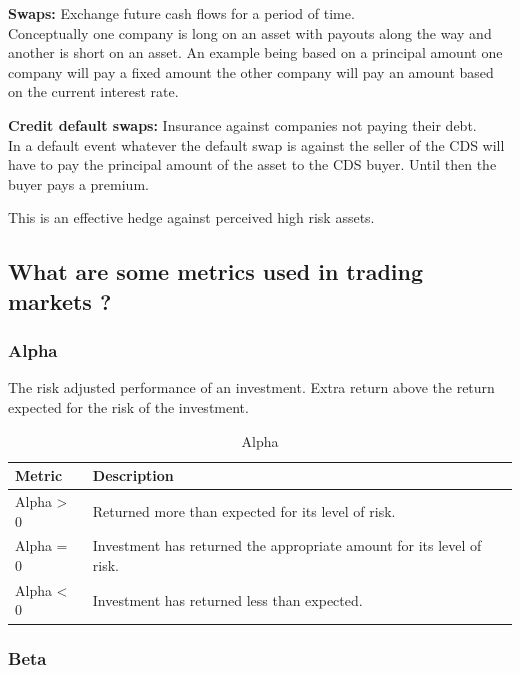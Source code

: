 \documentclass[11pt]{scrartcl} %
\begin{document}
\textbf{Swaps:} Exchange future cash flows for a period of time.\\

Conceptually one company is long on an asset with payouts along the way and another is short on an asset. An example being based on a principal amount one company will pay a fixed amount the other company will pay an amount based on the current interest rate.

\textbf{Credit default swaps:} Insurance against companies not paying their debt.\\

In a default event whatever the default swap is against the seller of the CDS will have to pay the principal amount of the asset to the CDS buyer. Until then the buyer pays a premium.

This is an effective hedge against perceived high risk assets.

\subsection{What are some metrics used in trading markets ?}

\subsubsection{Alpha}

The risk adjusted performance of an investment. Extra return above the return expected for the risk of the investment. 

\begin{table}[h] %
	\centering %
	\begin{tabular}{l l}
		\toprule
		\textbf{Metric} & \textbf{Description} \\
		\midrule
		Alpha > 0 & Returned more than expected for its level of risk.\\
		Alpha = 0 & Investment has returned the appropriate amount for its level of risk.\\
		Alpha < 0 & Investment has returned less than expected. \\
		\bottomrule
	\end{tabular}
	\caption{Alpha}
\end{table}

\subsubsection{Beta}
\end{document}
